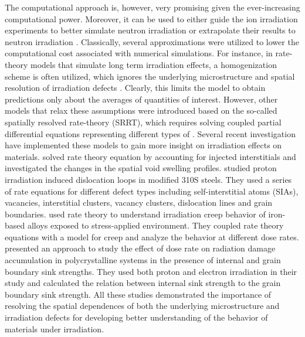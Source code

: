 \documentclass[utf8]{frontiersSCNS} %
\begin{document}
The computational approach is, however, very promising given the ever-increasing computational power. Moreover, it can be used to either guide the ion irradiation experiments to better simulate neutron irradiation or extrapolate their results to neutron irradiation \citep{xu2012}. Classically, several approximations were utilized to lower the computational cost associated with numerical simulations. For instance, in rate-theory models that simulate long term irradiation effects, a homogenization scheme is often utilized, which ignores the underlying microstructure and spatial resolution of irradiation defects \citep{was2017}. Clearly, this limits the model to obtain predictions only about the averages of quantities of interest. However, other models that relax these assumptions were introduced based on the so-called spatially resolved rate-theory (SRRT), which requires solving coupled partial differential equations representing different types of \citep{bennett1975, warburton1975, franklin1975, thompson1974, ullmaier1980}. Several recent investigation have implemented these models to gain more insight on irradiation effects on materials. \citep{short2016} solved rate theory equation by accounting for injected interstitials and investigated the changes in the spatial void swelling profiles. \citep{chen2019} studied proton irradiation induced dislocation loops in modified 310S steels. They used a series of rate equations for different defect types including self-interstitial atoms (SIAs), vacancies, interstitial clusters, vacancy clusters, dislocation lines and grain boundaries. \citep{choi2020} used rate theory to understand irradiation creep behavior of iron-based alloys exposed to stress-applied environment. They coupled rate theory equations with a model for creep and analyze the behavior at different dose rates. \citep{saidi2021} presented an approach to study the effect of dose rate on radiation damage accumulation in polycrystalline systems in the presence of internal and grain boundary sink strengths. They used both proton and electron irradiation in their study and calculated the relation between internal sink strength to the grain boundary sink strength. All these studies demonstrated the importance of resolving the spatial dependences of both the underlying microstructure and irradiation defects for developing better understanding of the behavior of materials under irradiation.
\end{document}
